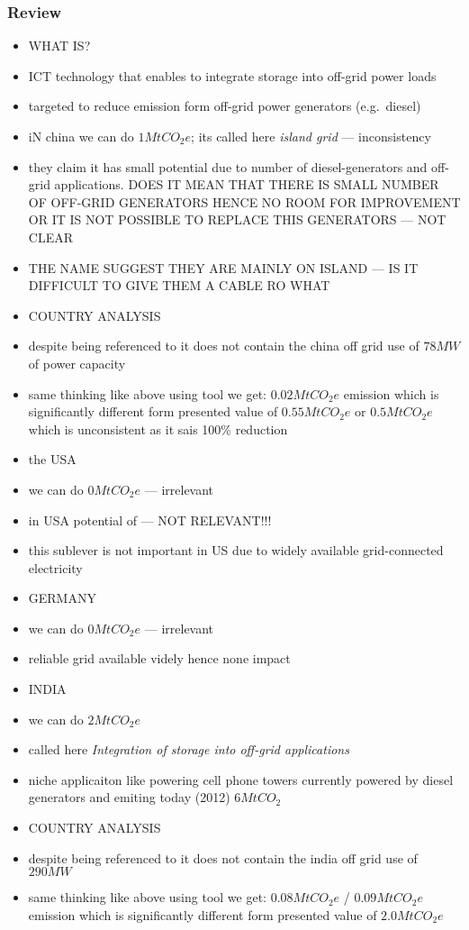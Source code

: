 \documentclass[11pt, twocolumn]{article}
\begin{document}
\subsubsection{Review}
\begin{itemize}
\item WHAT IS?
\item ICT technology that enables to integrate storage into off-grid power loads
\item targeted to reduce emission form off-grid power generators (e.g.\ diesel)


\item iN china we can do $1 Mt CO_2e$; its called here \emph{island grid} --- inconsistency
\item they claim it has small potential due to number of diesel-generators and off-grid applications. DOES IT MEAN THAT THERE IS SMALL NUMBER OF OFF-GRID GENERATORS HENCE NO ROOM FOR IMPROVEMENT OR IT IS NOT POSSIBLE TO REPLACE THIS GENERATORS --- NOT CLEAR
\item THE NAME SUGGEST THEY ARE MAINLY ON ISLAND --- IS IT DIFFICULT TO GIVE THEM A CABLE RO WHAT

\item COUNTRY ANALYSIS
\item despite being referenced to \citep{pieper2011revisiting} it does not contain the china off grid use of $78 MW$ of power capacity
\item same thinking like above using tool we get: $0.02 MtCO_2e$ emission which is significantly different form presented value of $0.55 MtCO_2e$ or $0.5 MtCO_2e$ which is unconsistent as it sais 100\% reduction



\item the USA
\item we can do $0 Mt CO_2e$ --- irrelevant
\item in USA potential of --- NOT RELEVANT!!!
\item this sublever is not important in US due to widely available grid-connected electricity

\item GERMANY
\item we can do $0 Mt CO_2e$ --- irrelevant
\item reliable grid available videly hence none impact


\item INDIA
\item we can do $2 Mt CO_2e$
\item called here \emph{Integration of storage into off-grid applications}
\item niche applicaiton like powering cell phone towers currently powered by diesel generators and emiting today (2012) $6 MtCO_2$
\item COUNTRY ANALYSIS
\item despite being referenced to \citep{pieper2011revisiting} it does not contain the india off grid use of $290MW$
\item same thinking like above using tool we get: $0.08 MtCO_2e$ / $0.09 MtCO_2e$ emission which is significantly different form presented value of $2.0 MtCO_2e$



\end{itemize}
\end{document}

